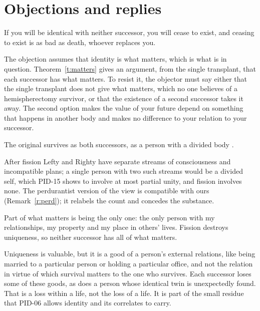 \documentclass{situationist-preprint}
\begin{document}
\section{Objections and replies}\label{s:obj}

\begin{objection}
If you will be identical with neither successor, you will cease to exist, and ceasing to exist is as bad as death, whoever replaces you.
\end{objection}

\begin{reply}
The objection assumes that identity is what matters, which is what is in question. Theorem~\ref{t:matters} gives an argument, from the single transplant, that each successor has what matters. To resist it, the objector must say either that the single transplant does not give what matters, which no one believes of a hemispherectomy survivor, or that the existence of a second successor takes it away. The second option makes the value of your future depend on something that happens in another body and makes no difference to your relation to your successor.
\end{reply}

\begin{objection}
The original survives as both successors, as a person with a divided body \citep{Lewis1976}.
\end{objection}

\begin{reply}
After fission Lefty and Righty have separate streams of consciousness and incompatible plans; a single person with two such streams would be a divided self, which PID-15 shows to involve at most partial unity, and fission involves none. The perdurantist version of the view is compatible with ours (Remark~\ref{r:perd}); it relabels the count and concedes the substance.
\end{reply}

\begin{objection}
Part of what matters is being the only one: the only person with my relationships, my property and my place in others' lives. Fission destroys uniqueness, so neither successor has all of what matters.
\end{objection}

\begin{reply}
Uniqueness is valuable, but it is a good of a person's external relations, like being married to a particular person or holding a particular office, and not the relation in virtue of which survival matters to the one who survives. Each successor loses some of these goods, as does a person whose identical twin is unexpectedly found. That is a loss within a life, not the loss of a life. It is part of the small residue that PID-06 allows identity and its correlates to carry.
\end{reply}
\end{document}
